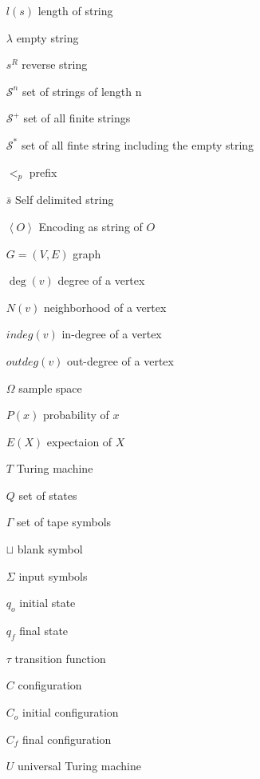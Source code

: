 \begin{itemize}

\item [$l(s)$] length of string
\item [$\lambda$] empty string
\item [$s^R$] reverse string
\item [$\mathcal{S}^{n}$] set of strings of length n
\item [$\mathcal{S}^{+}$] set of all finite strings
\item [$\mathcal{S}^{\ast}$] set of all finte string including the empty string
\item [$<_p$] prefix
\item [$\bar{s}$] Self delimited string
\item [$\left\langle O\right\rangle$] Encoding as string of $O$


\item [$G = (V,E)$] graph
\item [$\deg(v)$] degree of a vertex
\item [$N(v)$] neighborhood of a vertex
\item [$indeg(v)$] in-degree of a vertex
\item [$outdeg(v)$] out-degree of a vertex


\item[$\Omega$] sample space
\item[$P(x)$] probability of $x$
\item[$E(X)$] expectaion of $X$

%
%

\bigskip

\item [$T$] Turing machine
\item [$Q$] set of states
\item [$\Gamma$] set of tape symbols
\item [$\sqcup$] blank symbol
\item [$\Sigma$] input symbols
\item [$q_o$] initial state
\item [$q_f$] final state
\item [$\tau$] transition function
\item [$C$] configuration
\item [$C_o$] initial configuration
\item [$C_f$] final configuration
\item [$U$] universal Turing machine


\end{itemize}
